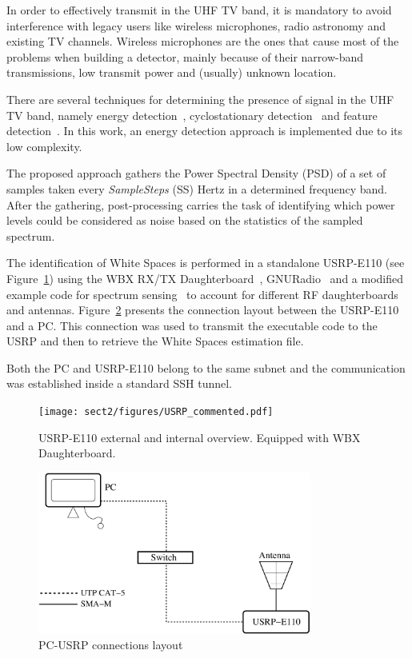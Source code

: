 In order to effectively transmit in the UHF TV band, it is mandatory to avoid interference with legacy users like wireless microphones, radio astronomy and existing TV channels. Wireless microphones are the ones that cause most of the problems when building a detector, mainly because of their narrow-band transmissions, low transmit power and (usually) unknown location. 

There are several techniques for determining the presence of signal in the UHF TV band, namely energy detection~\cite{cabric2006experimental}, cyclostationary detection~\cite{kim2007cyclostationary} and feature detection~\cite{cabric2006spectrum}. In this work, an energy detection approach is implemented due to its low complexity.

The proposed approach gathers the Power Spectral Density (PSD) of a set of samples taken every \emph{SampleSteps} (SS) Hertz in a determined frequency band. After the gathering, post-processing carries the task of identifying which power levels could be considered as noise based on the statistics of the sampled spectrum.

The identification of White Spaces is performed in a standalone USRP-E110 (see Figure~\ref{fig:usrp_combined}) using the WBX RX/TX Daughterboard~\cite{ettusWBX}, GNURadio~\cite{GNURadio} and a modified example code for spectrum sensing~\cite{sanabriaCodeUSRP} to account for different RF daughterboards and antennas. Figure~\ref{fig:connections} presents the connection layout between the USRP-E110 and a PC. This connection was used to transmit the executable code to the USRP and then to retrieve the White Spaces estimation file.

Both the PC and USRP-E110 belong to the same subnet and the communication was established inside a standard SSH tunnel.

\begin{figure}[htbp]
  \centering
  \texttt{[image: sect2/figures/USRP\_commented.pdf]}
  \caption{USRP-E110 external and internal overview. Equipped with WBX Daughterboard.}
  \label{fig:usrp_combined}
\end{figure}

\begin{figure}[htbp]
  \centering
  \includegraphics[width = 9cm]{sect2/figures/connections.pdf}
  \caption{PC-USRP connections layout}
  \label{fig:connections}
\end{figure}